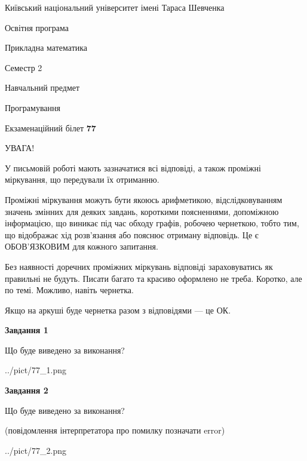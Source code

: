 \documentclass[12pt, ukrainian]{article}
\begin{document}
{{\begin {small}\par
{ \center  Київський національний університет імені Тараса Шевченка \par}
{\parbox {5 cm}{Освітня програма \hfill}{\parbox {7 cm}{Прикладна математика\hfill}}\parbox {6 cm}{\hfill Семестр 2}}\par
{\parbox {5 cm} {Навчальний предмет \hfill}\parbox {7 cm}{Програмування \hfill}\parbox {6cm}{\hfill}\par}\vspace{-7pt} \end{small}}{\center Екзаменаційний білет \No \textbf
{ 77 }\par}}
{
\begin {large}
УВАГА!

У письмовій роботі мають зазначатися всі відповіді, а також проміжні міркування, що передували їх отриманню.

Проміжні міркування можуть бути якоюсь арифметикою, відслідковуванням зна\-чень змінних для деяких завдань,
короткими поясненнями, допоміжною інформацією, що виникає під час обходу графів, робочею чернеткою,
тобто тим, що відображає хід розв’язання або пояснює отриману відповідь.
Це є ОБОВ’ЯЗКОВИМ для кожного запитання.

Без наявності доречних проміжних міркувань відповіді зараховуватись як правиль\-ні не будуть.
Писати багато та красиво оформлено не треба. Коротко, але по темі. Можли\-во, навіть чернетка.

Якщо на аркуші буде чернетка разом з відповідями --- це ОК.

\newpage

{\begin {center}\textbf{Завдання 1}\end {center}}\par
Що буде виведено за виконання?\par
\begin{center}
	{../pict/77_1.png}
\end{center}
\newpage

{\begin {center}\textbf{Завдання 2}\end {center}}\par
Що буде виведено за виконання?\par
 (повідомлення інтерпретатора про помилку позначати error)\par
\begin{center}
	{../pict/77_2.png}
\end{center}
\newpage


\end{large}}
\end{document}

